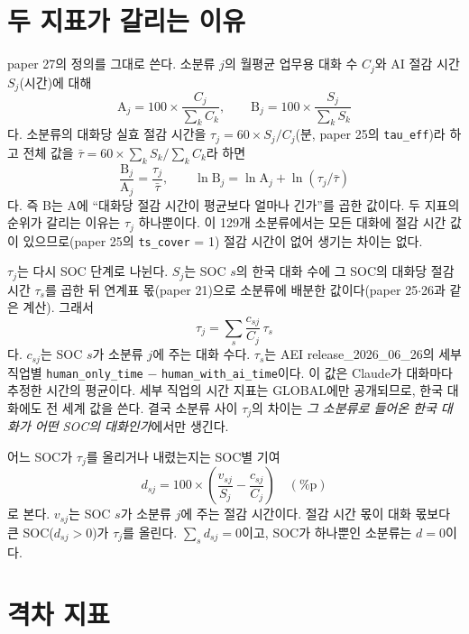 \documentclass[11pt]{article}
\begin{document}
\section{두 지표가 갈리는 이유}

paper 27의 정의를 그대로 쓴다. 소분류 $j$의 월평균 업무용 대화 수 $C_j$와 AI 절감 시간 $S_j$(시간)에 대해
\[
\text{A}_j = 100 \times \frac{C_j}{\sum_k C_k}, \qquad \text{B}_j = 100 \times \frac{S_j}{\sum_k S_k}
\]
다. 소분류의 대화당 실효 절감 시간을 $\tau_j = 60 \times S_j / C_j$(분, paper 25의 \texttt{tau\_eff})라 하고 전체 값을 $\bar\tau = 60 \times \sum_k S_k / \sum_k C_k$라 하면
\[
\frac{\text{B}_j}{\text{A}_j} = \frac{\tau_j}{\bar\tau}, \qquad \ln \text{B}_j = \ln \text{A}_j + \ln(\tau_j / \bar\tau)
\]
다. 즉 B는 A에 ``대화당 절감 시간이 평균보다 얼마나 긴가''를 곱한 값이다. 두 지표의 순위가 갈리는 이유는 $\tau_j$ 하나뿐이다. 이 129개 소분류에서는 모든 대화에 절감 시간 값이 있으므로(paper 25의 \texttt{ts\_cover} = 1) 절감 시간이 없어 생기는 차이는 없다.

$\tau_j$는 다시 SOC 단계로 나뉜다. $S_j$는 SOC $s$의 한국 대화 수에 그 SOC의 대화당 절감 시간 $\tau_s$를 곱한 뒤 연계표 몫(paper 21)으로 소분류에 배분한 값이다(paper 25$\cdot$26과 같은 계산). 그래서
\[
\tau_j = \sum_s \frac{c_{sj}}{C_j} \, \tau_s
\]
다. $c_{sj}$는 SOC $s$가 소분류 $j$에 주는 대화 수다. $\tau_s$는 AEI release\_2026\_06\_26의 세부 직업별 \texttt{human\_only\_time} $-$ \texttt{human\_with\_ai\_time}이다. 이 값은 Claude가 대화마다 추정한 시간의 평균이다\parencite{tamkin-2025-estimating-ai-productivity-gains-from,appel-2026-economic-primitives}. 세부 직업의 시간 지표는 GLOBAL에만 공개되므로, 한국 대화에도 전 세계 값을 쓴다. 결국 소분류 사이 $\tau_j$의 차이는 \emph{그 소분류로 들어온 한국 대화가 어떤 SOC의 대화인가}에서만 생긴다.

어느 SOC가 $\tau_j$를 올리거나 내렸는지는 SOC별 기여
\[
d_{sj} = 100 \times \left( \frac{v_{sj}}{S_j} - \frac{c_{sj}}{C_j} \right) \quad (\%\text{p})
\]
로 본다. $v_{sj}$는 SOC $s$가 소분류 $j$에 주는 절감 시간이다. 절감 시간 몫이 대화 몫보다 큰 SOC($d_{sj} > 0$)가 $\tau_j$를 올린다. $\sum_s d_{sj} = 0$이고, SOC가 하나뿐인 소분류는 $d = 0$이다.

\section{격차 지표}
\end{document}

